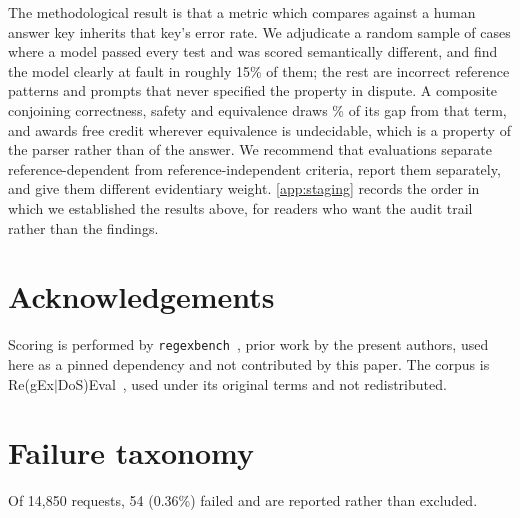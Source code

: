 \documentclass[11pt]{article}
\begin{document}
The methodological result is that a metric which compares against a human
answer key inherits that key's error rate. We adjudicate a random sample of
cases where a model passed every test and was scored semantically different,
and find the model clearly at fault in roughly 15\% of them; the rest are
incorrect reference patterns and prompts that never specified the property in
dispute. A composite conjoining correctness, safety and equivalence draws
\equivshare{}\% of its gap from that term, and awards free credit wherever
equivalence is undecidable, which is a property of the parser rather than of
the answer. We recommend that evaluations separate reference-dependent from
reference-independent criteria, report them separately, and give them
different evidentiary weight. \cref{app:staging} records the order in which we
established the results above, for readers who want the audit trail rather
than the findings.

\section*{Acknowledgements}

Scoring is performed by \texttt{regexbench}~\citep{regexbench}, prior work by
the present authors, used here as a pinned dependency and not contributed by
this paper. The corpus is Re(gEx$|$DoS)Eval~\citep{siddiq2024regexeval}, used under its
original terms and not redistributed.




\appendix

\section{Failure taxonomy}
\label{app:failures}

Of 14{,}850 requests, 54 (0.36\%) failed and are reported rather than
excluded.
\end{document}
